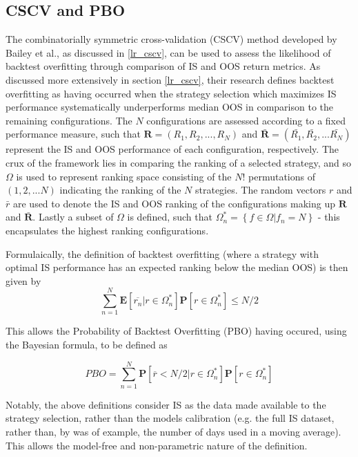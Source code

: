 \documentclass[a4paper,11pt,oneside]{article}
\theoremstyle{plain}
\theoremstyle{definition}
\begin{document}
	
	\subsection{CSCV and PBO}\label{imp_cscv}
	
	The  combinatorially symmetric cross-validation (CSCV) method developed by Bailey et al., as discussed in \ref{lr_cscv}, can be used to assess the likelihood of backtest overfitting through comparison of IS and OOS return metrics. As discussed more extensively in section \ref{lr_cscv}, their research defines backtest overfitting as having
	occurred when the strategy selection which maximizes IS performance systematically underperforms median OOS in comparison to the remaining configurations. The $N$  configurations are assessed according to a fixed performance measure, such that $\mathbf{R} = (R_1, R_2, ..., R_N)$ and $\mathbf{\bar{R}} = (\bar{R_1}, \bar{R_2},... \bar{R_N})$ represent the IS and OOS performance of each configuration, respectively. The crux of the framework lies in comparing the ranking of a selected strategy, and so $\Omega$ is used to represent ranking space consisting of the $N!$ permutations of $(1,2,...N)$ indicating the ranking of the $N$ strategies. The random vectors $r$ and $\bar{r}$ are used to denote the IS and OOS ranking of the configurations making up $\mathbf{R}$ and $\mathbf{\bar{R}}$. Lastly a subset of $\Omega$ is defined, such that $\Omega_{n}^{*}=\left\{f \in \Omega | f_{n}=N\right\}$ - this encapsulates the highest ranking configurations. \newline
	
	
	Formulaically, the definition of backtest overfitting (where a strategy with optimal IS performance has an expected ranking below the median OOS) is then given by
	\begin{equation}\label{eq:PBO1}
	\sum_{n=1}^{N}\mathbf{E}[\overline{r_n}|r\in 
	\Omega_{n}^{*}]\mathbf{P}[r\in\Omega_{n}^{*}]\leq{N/2}
	\end{equation}
	
	This allows the Probability of Backtest Overfitting (PBO) having occured, using the Bayesian formula, to be defined as 
	
	\begin{equation}\label{eq:PBO2}
	PBO = \sum_{n=1}^{N}\mathbf{P}[\overline{r} < {N/2}|r\in\Omega_{n}^{*}]\mathbf{P}[r\in\Omega_{n}^{*}]
	\end{equation}
	
	Notably, the above definitions consider IS as the data made available to the strategy selection, rather than the 
	models calibration (e.g. the full IS dataset, rather than, by was of example, the number of days used in a moving average). 
	This allows the model-free and non-parametric nature of the definition. 
	\hfill \break 
	
\end{document}
